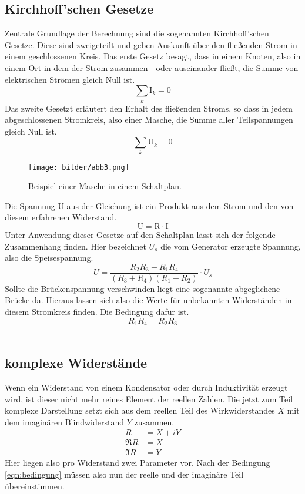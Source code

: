\subsection{Kirchhoff'schen Gesetze}
Zentrale Grundlage der Berechnung sind die sogenannten Kirchhoff'schen Gesetze. Diese sind zweigeteilt und 
geben Auskunft über den fließenden Strom in einem geschlossenen Kreis.
Das erste Gesetz besagt, dass in einem Knoten, also in einem Ort in dem der Strom zusammen - oder auseinander fließt, 
die Summe von elektrischen Strömen gleich Null ist.
\begin{equation}
    \sum_k \text{I}_k = 0
\end{equation}
Das zweite Gesetzt erläutert den Erhalt des fließenden Stroms, so dass in jedem abgeschlossenen Stromkreis, also einer Masche,
die Summe aller Teilspannungen gleich Null ist.
\begin{equation}
    \label{eqn:kirch2}
    \sum_k \text{U}_k = 0
\end{equation}
\begin{figure}
    \centering
    \texttt{[image: bilder/abb3.png]}
    \caption{Beispiel einer Masche in einem Schaltplan. \cite{skript}} 
    \label{fig:abb3}
\end{figure}
Die Spannung U aus der Gleichung ist ein Produkt aus dem Strom und den von diesem erfahrenen Widerstand.
\begin{equation}
    \text{U} = \text{R}\cdot \text{I}
\end{equation}
Unter Anwendung dieser Gesetze auf den Schaltplan %
lässt sich der folgende Zusammenhang finden. Hier bezeichnet $U_s$ die vom Generator erzeugte Spannung, also die Speisespannung. 
\begin{equation}
     U= \frac{R_2R_3 - R_1R_4}{(R_3+R_4)(R_1+R_2)}\cdot U_s
\end{equation}
Sollte die Brückenspannung verschwinden liegt eine sogenannte abgeglichene Brücke da. 
Hieraus lassen sich also die Werte für unbekannten Widerständen in diesem Stromkreis finden.
Die Bedingung dafür ist.
\begin{equation}
    \label{eqn:bedingung}
    R_1 R_4 = R_2 R_3
\end{equation}
\\
\newline
\subsection{komplexe Widerstände}
Wenn ein Widerstand von einem Kondensator oder durch Induktivität erzeugt wird, ist dieser nicht mehr reines 
Element der reellen Zahlen. 
Die jetzt zum Teil komplexe Darstellung setzt sich aus dem reellen Teil des Wirkwiderstandes $X$ mit 
dem imaginären Blindwiderstand $Y$ zusammen. 
\begin{align*}
    R &= X +iY \\
    \Re{R} &= X \\
    \Im{R} &= Y 
\end{align*} 
Hier liegen also pro Widerstand zwei Parameter vor. Nach der Bedingung \eqref{eqn:bedingung} müssen also
nun der reelle und der imaginäre Teil übereinstimmen. 
\\
\newline

